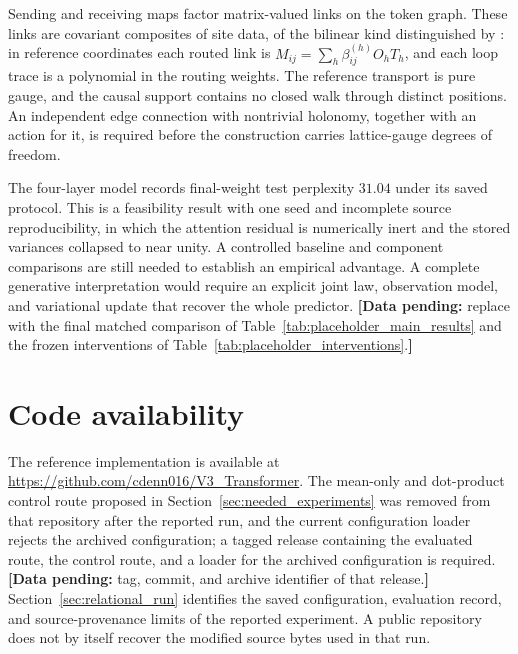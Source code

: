 \documentclass[twoside,11pt]{article}
\providecommand{\datapending}[1]{{\color{red!60!black}\textbf{[Data pending:} #1\textbf{]}}}
\begin{document}
Sending and receiving maps factor matrix-valued links on the token graph. These links are covariant composites of site data, of the bilinear kind distinguished by \citet[Sec.~I]{Wetterich2014LinearLattice}: in reference coordinates each routed link is $M_{ij}=\sum_h\beta_{ij}^{(h)}O_hT_h$, and each loop trace is a polynomial in the routing weights. The reference transport is pure gauge, and the causal support contains no closed walk through distinct positions. An independent edge connection with nontrivial holonomy, together with an action for it, is required before the construction carries lattice-gauge degrees of freedom.

The four-layer model records final-weight test perplexity $31.04$ under its saved protocol. This is a feasibility result with one seed and incomplete source reproducibility, in which the attention residual is numerically inert and the stored variances collapsed to near unity. A controlled baseline and component comparisons are still needed to establish an empirical advantage. A complete generative interpretation would require an explicit joint law, observation model, and variational update that recover the whole predictor.
\datapending{replace with the final matched comparison of Table~\ref{tab:placeholder_main_results} and the frozen interventions of Table~\ref{tab:placeholder_interventions}.} %

\section*{Code availability}
The reference implementation is available at \url{https://github.com/cdenn016/V3_Transformer}. The mean-only and dot-product control route proposed in Section~\ref{sec:needed_experiments} was removed from that repository after the reported run, and the current configuration loader rejects the archived configuration; a tagged release containing the evaluated route, the control route, and a loader for the archived configuration is required.
\datapending{tag, commit, and archive identifier of that release.} %
Section~\ref{sec:relational_run} identifies the saved configuration, evaluation record, and source-provenance limits of the reported experiment. A public repository does not by itself recover the modified source bytes used in that run.

\end{document}
